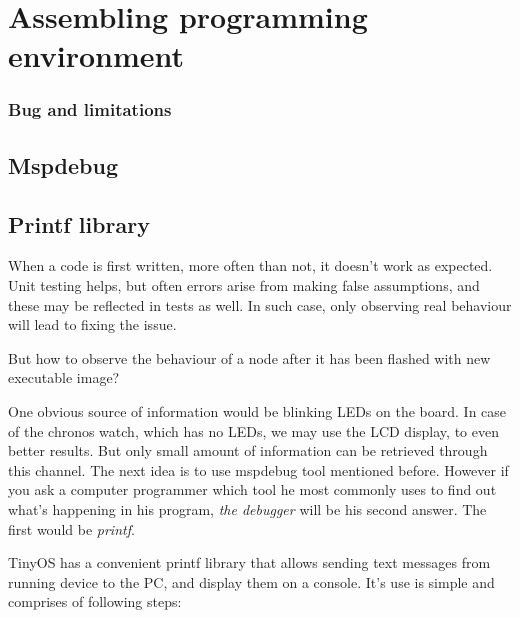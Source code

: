 \chapter{Assembling programming environment}


\subsection{Bug and limitations}


\section{Mspdebug}

\section{Printf library}
\label{sec:printf_library}

When a code is first written, more often than not, it doesn't work as
expected. Unit testing helps, but often errors arise from making false
assumptions, and these may be reflected in tests as well. In such
case, only observing real behaviour will lead to fixing the issue.

But how to observe the behaviour of a node after it has been flashed
with new executable image?

One obvious source of information would be blinking LEDs on the board.
In case of the chronos watch, which has no LEDs, we may use the LCD
display, to even better results. But only small amount of information
can be retrieved through this channel. The next idea is to use
mspdebug tool mentioned before.  However if you ask a computer
programmer which tool he most commonly uses to find out what's
happening in his program, \emph{the debugger} will be his second
answer. The first would be \emph{printf}.

TinyOS has a convenient printf library that allows sending text
messages from running device to the PC, and display them on a console.
It's use is simple and comprises of following steps:

